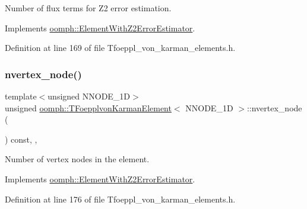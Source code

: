 Number of \textquotesingle{}flux\textquotesingle{} terms for Z2 error estimation. 



Implements \hyperlink{classoomph_1_1ElementWithZ2ErrorEstimator_ae82c5728902e13da31be19c390fc28e3}{oomph\+::\+Element\+With\+Z2\+Error\+Estimator}.



Definition at line 169 of file Tfoeppl\+\_\+von\+\_\+karman\+\_\+elements.\+h.

\mbox{\label{classoomph_1_1TFoepplvonKarmanElement_aee9854af71ebdca47e675ee73dc589e4}} 
\subsubsection{\texorpdfstring{nvertex\+\_\+node()}{nvertex\_node()}}
{\footnotesize\ttfamily template$<$unsigned N\+N\+O\+D\+E\+\_\+1D$>$ \\
unsigned \hyperlink{classoomph_1_1TFoepplvonKarmanElement}{oomph\+::\+T\+Foepplvon\+Karman\+Element}$<$ N\+N\+O\+D\+E\+\_\+1D $>$\+::nvertex\+\_\+node (\begin{DoxyParamCaption}{ }\end{DoxyParamCaption}) const\hspace{0.3cm}{\ttfamily [inline]}, {\ttfamily [protected]}, {\ttfamily [virtual]}}



Number of vertex nodes in the element. 



Implements \hyperlink{classoomph_1_1ElementWithZ2ErrorEstimator_a19495a0e77ef4ff35f15fdf7913b4077}{oomph\+::\+Element\+With\+Z2\+Error\+Estimator}.



Definition at line 176 of file Tfoeppl\+\_\+von\+\_\+karman\+\_\+elements.\+h.

\mbox{\label{classoomph_1_1TFoepplvonKarmanElement_a3ae70062aaba5d085af4e1bf247cfd4b}} 
